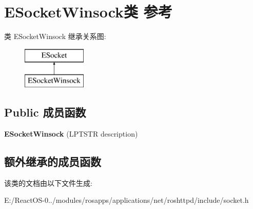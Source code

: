 \hypertarget{class_e_socket_winsock}{}\section{E\+Socket\+Winsock类 参考}
\label{class_e_socket_winsock}
类 E\+Socket\+Winsock 继承关系图\+:\begin{figure}[H]
\begin{center}
\leavevmode
\includegraphics[height=2.000000cm]{class_e_socket_winsock}
\end{center}
\end{figure}
\subsection*{Public 成员函数}
\begin{DoxyCompactItemize}
\item 
\mbox{\label{class_e_socket_winsock_aca9ba7f11ae5f6d1f7f9834ae7340e17}} 
{\bfseries E\+Socket\+Winsock} (L\+P\+T\+S\+TR description)
\end{DoxyCompactItemize}
\subsection*{额外继承的成员函数}


该类的文档由以下文件生成\+:\begin{DoxyCompactItemize}
\item 
E\+:/\+React\+O\+S-\/0../modules/rosapps/applications/net/roshttpd/include/socket.\+h\end{DoxyCompactItemize}
